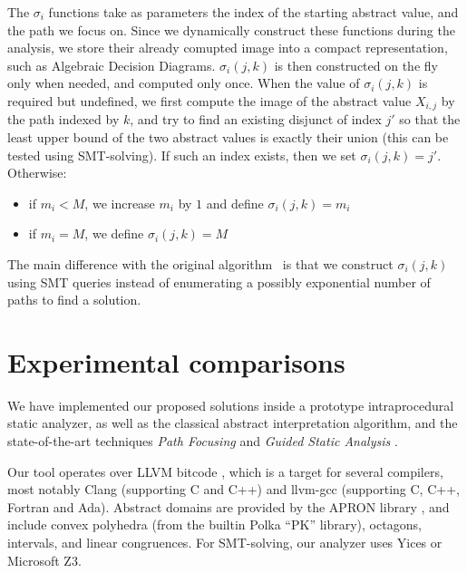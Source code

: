 \documentclass[preprint]{sigplanconf}
\newcommand{\MM}[1]{{\color{blue} TODO(MM): #1}}
\newcommand{\JH}[1]{{\color{teal} TODO(JH): #1}}
\newcommand{\DM}[1]{{\color{violet} TODO(DM): #1}}
\begin{document}
The $\sigma_i$ functions take as parameters the index of the starting abstract
value, and the path we focus on. 
Since we dynamically construct these functions
during the analysis, we store their already comupted image into a
compact representation, such as Algebraic Decision Diagrams.
$\sigma_i(j,k)$ is then constructed on the fly only when needed, and computed
only once.
When the value of $\sigma_i(j,k)$ is required but undefined, we first compute
the image of the
abstract value $X_{i,j}$ by the path indexed by $k$, and try to find an existing
disjunct of index $j'$ so that the least upper bound of the two abstract values is exactly their union (this can be tested using SMT-solving).
If such an index exists, then we set $\sigma_i(j,k) = j'$.
Otherwise:
\begin{itemize}[itemsep=-1\parsep,topsep=0pt]
	\item if $m_i < M$, we increase $m_i$ by $1$ and define $\sigma_i(j,k) = m_i$
	\item if $m_i = M$, we define $\sigma_i(j,k) = M$ 
\end{itemize}
The main difference with the original
algorithm~\cite{DBLP:conf/pldi/GulwaniZ10} is that we construct
$\sigma_i(j,k)$ using SMT queries instead of enumerating a possibly
exponential number of paths to find a solution.

\section{Experimental comparisons}
\label{sec:experiments}

We have implemented our proposed solutions inside a prototype intraprocedural
static analyzer,
as well as the classical abstract interpretation algorithm, and the state-of-the-art
techniques \emph{Path Focusing} \cite{Monniaux_Gonnord_SAS11} and \emph{Guided
Static Analysis} \cite{DBLP:conf/sas/GopanR07}.

%
Our tool operates over LLVM bitcode \citep{LLVM_langref,Lattner:2004:LCF:977395.977673}, which is a target for several compilers, most notably Clang (supporting C and C++) and llvm-gcc (supporting C, C++, Fortran and Ada).
Abstract domains are provided by the APRON library \citep{DBLP:conf/cav/JeannetM09}, and include convex polyhedra (from the builtin Polka ``PK'' library), octagons, intervals, and linear congruences.
For SMT-solving, our analyzer uses Yices
\cite{DBLP:conf/cav/DutertreM06} or Microsoft Z3\cite{DBLP:conf/tacas/MouraB08}.
\end{document}
